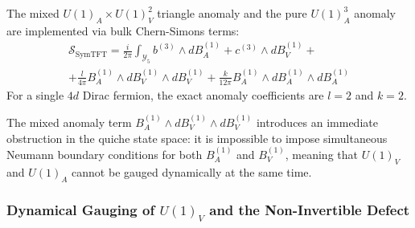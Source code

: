 \documentclass[aps,preprint,nofootinbib,preprintnumbers,eqsecnum,superscriptaddress]{revtex4}
\numberwithin{equation}{section}
\begin{document}
The mixed $U(1)_A \times U(1)_V^2$ triangle anomaly and the pure $U(1)_A^3$ anomaly are implemented via bulk Chern-Simons terms:
\begin{multline}
\label{eq:SymTFT_ungauged}
    \mathcal{S}_{\text{SymTFT}} =  \frac{i}{2\pi} \int_{\mathcal{Y}_5}  b^{(3)} \wedge dB^{(1)}_A + c^{(3)}  \wedge dB^{(1)}_V + \\ + \frac{l}{4\pi} B^{(1)}_A \wedge dB^{(1)}_V \wedge dB^{(1)}_V  + \frac{k}{12\pi} B^{(1)}_A \wedge dB^{(1)}_A \wedge dB^{(1)}_A
\end{multline}
For a single $4d$ Dirac fermion, the exact anomaly coefficients are $l = 2$ and $k = 2$. 

The mixed anomaly term $B^{(1)}_A \wedge dB^{(1)}_V \wedge dB^{(1)}_V$ introduces an immediate obstruction in the quiche state space: it is impossible to impose simultaneous Neumann boundary conditions for both $B^{(1)}_A$ and $B^{(1)}_V$, meaning that $U(1)_V$ and $U(1)_A$ cannot be gauged dynamically at the same time.

\subsubsection{Dynamical Gauging of $U(1)_V$ and the Non-Invertible Defect}
\end{document}
